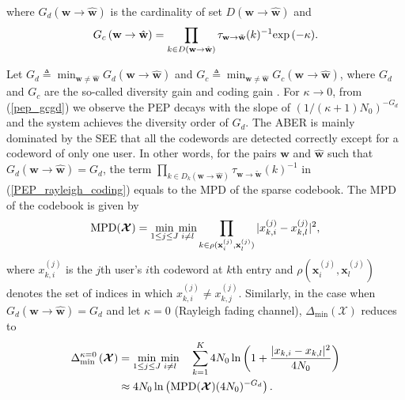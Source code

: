 \documentclass[journal]{IEEEtran}
\begin{document}
where ${G_{d} (\mathbf {w}\rightarrow \hat {\mathbf {w}})}$ is the cardinality of set $D(\mathbf {w}\rightarrow \hat {\mathbf {w}})$ and
\begin{equation}
 \small
\label{PEP_rayleigh_coding}
\begin{aligned} 
G_{c} \left(\mathbf {w}\rightarrow \hat{\mathbf {w}} \right)=
 {\prod \limits _{k \in D (\mathbf {w}\rightarrow \hat {\mathbf {w}})}      \tau _{{{\mathbf w}} \rightarrow {\tilde{\mathbf{w}}}}(k)    ^{-1}
 {\exp \left(- \kappa \right) }}. 
\end{aligned}
  \end{equation}
   
   Let $G_{d}\triangleq \min _{\mathbf {w}\neq \hat {\mathbf {w}}}G_{d} (\mathbf {w}\rightarrow \hat {\mathbf {w}})$ and $G_{c}\triangleq \min _{\mathbf {w}\neq \hat {\mathbf {w}}}G_{c} (\mathbf {w}\rightarrow \hat {\mathbf {w}})$, where $G_{d}$ and $G_{c}$ are the so-called   diversity gain and coding gain \cite{xin2003space}.  
     For  $\kappa \rightarrow 0$,      from (\ref{pep_gcgd})   we observe  the PEP  decays with the slope of $\left ( 1/{\left( \kappa +1\right)N_0} \right)^{-{G_{d}}}$ and the system achieves the diversity order of $G_{d}$. The ABER is mainly dominated by the SEE that all the codewords are detected correctly except for  a codeword of only one user. In other words,  for the pairs $ \mathbf {w} $ and $\hat {\mathbf {w}} $ such that $ G_{d} (\mathbf {w}\rightarrow \hat {\mathbf {w}}) = G_{d}$,    the  term ${\prod \nolimits _{k \in D_k (\mathbf {w}\rightarrow \hat {\mathbf {w}})}      \tau _{{{\mathbf w}} \rightarrow {\tilde{\mathbf{w}}}}(k)    ^{-1}}$ in  (\ref{PEP_rayleigh_coding}) equals to the MPD of the sparse codebook. The MPD of the codebook  is given by 
     \begin{equation} 
 \small
\text{MPD}(\boldsymbol {\mathcal X})= \underset {1\leq j\leq J} {\min }     \underset {i\neq l}{\min } \prod _{k \in \rho(\mathbf {x}_i^{(j)}, {\mathbf {x}}_l^{(j)})} |x_{k,i}^{(j)}-x_{k,l}^{(j)}|^{2},
\end{equation}
  where $x_{k,i}^{(j)}$ is the $j$th user's $i$th codeword at $k$th entry and
  $\rho (\mathbf {x}_i^{(j)}, {\mathbf {x}}_l^{(j)})$ denotes the set of  indices in which $ {x}_{k,i}^{(j)} \neq {{x}}_{k,j}^{(j)}$. 
 Similarly, in  the case when $ G_{d} (\mathbf {w}\rightarrow \hat {\mathbf {w}}) = G_{d}$ and let $\kappa =  0$ (Rayleigh fading channel),  ${{\Delta}_{\min} \left( { \boldsymbol {\mathcal X}} \right)}$ reduces to  
 \begin{equation} 
 \small
 \label{k0}
 \begin{aligned}
{{\Delta}_{\min}^{\kappa = 0} \left( { \boldsymbol {\mathcal X}} \right)} &  =    \underset {1\leq j\leq J} {\min }    \underset {i\neq l}{\min }  \quad \sum \limits _{k=1}^K   { 4N_0   \ln \left(1+  \frac{{  |x_{k,i}-x_{k,l}|^{2} }  } {4N_0}   \right) }\\
& \approx 4N_0 \ln \left(\text{MPD}(\boldsymbol {\mathcal X})  (4N_0)^{-G_d}  \right).
 \end{aligned}
  \end{equation}
\end{document}
